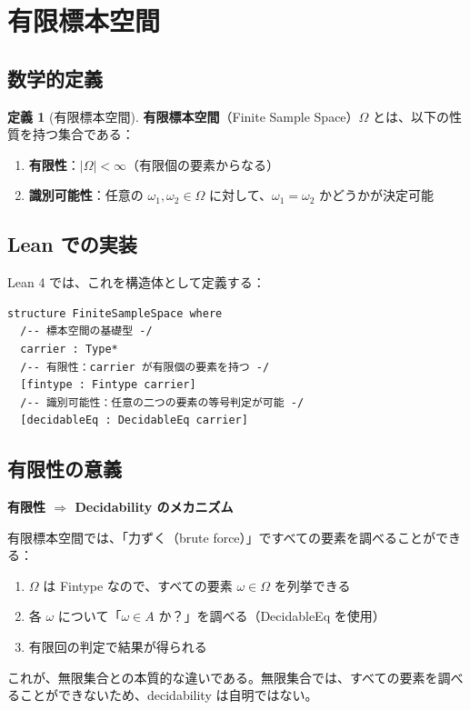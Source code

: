\documentclass[12pt,a4paper,ja=standard]{bxjsarticle}
\theoremstyle{definition}
\newtheorem{definition}{定義}[section]
\begin{document}
\section{有限標本空間}\label{sec:finite-sample-space}

\subsection{数学的定義}

\begin{definition}[有限標本空間]
\textbf{有限標本空間}（Finite Sample Space）$\Omega$ とは、以下の性質を持つ集合である：
\begin{enumerate}
    \item \textbf{有限性}：$|\Omega| < \infty$（有限個の要素からなる）
    \item \textbf{識別可能性}：任意の $\omega_1, \omega_2 \in \Omega$ に対して、$\omega_1 = \omega_2$ かどうかが決定可能
\end{enumerate}
\end{definition}

\subsection{Lean での実装}

Lean 4 では、これを構造体として定義する：

\begin{tcolorbox}[title=Lean コード（123--130 行目）]
\begin{verbatim}
structure FiniteSampleSpace where
  /-- 標本空間の基礎型 -/
  carrier : Type*
  /-- 有限性：carrier が有限個の要素を持つ -/
  [fintype : Fintype carrier]
  /-- 識別可能性：任意の二つの要素の等号判定が可能 -/
  [decidableEq : DecidableEq carrier]
\end{verbatim}
\end{tcolorbox}

\subsection{有限性の意義}

\begin{insight}
\textbf{有限性 $\Rightarrow$ Decidability のメカニズム}

有限標本空間では、「力ずく（brute force）」ですべての要素を調べることができる：

\begin{enumerate}
    \item $\Omega$ は Fintype なので、すべての要素 $\omega \in \Omega$ を列挙できる
    \item 各 $\omega$ について「$\omega \in A$ か？」を調べる（DecidableEq を使用）
    \item 有限回の判定で結果が得られる
\end{enumerate}

これが、無限集合との本質的な違いである。無限集合では、すべての要素を調べることができないため、decidability は自明ではない。
\end{insight}
\end{document}
